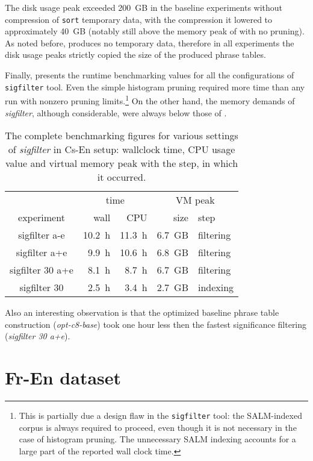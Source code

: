 The disk usage peak exceeded 200~GB in the baseline experiments without compression of
\texttt{sort} temporary data, with the compression it lowered to approximately 40~GB
(notably still above the memory peak of \eppex{} with no pruning).
As noted before, \eppex{} produces no temporary data, therefore in all experiments the
disk usage peaks strictly copied the size of the produced phrase tables.

Finally,  presents the runtime benchmarking
values for all the configurations of \texttt{sigfilter} tool.
Even the simple histogram pruning required more time than any \eppex{} run with nonzero
pruning limits.\footnote{This is partially due a design flaw in the \texttt{sigfilter} tool:
the SALM-indexed corpus is always required to proceed, even though it is not necessary in
the case of histogram pruning. The unnecessary SALM indexing accounts for a large part
of the reported wall clock time.}
On the other hand, the memory demands of \emph{sigfilter}, although considerable, were
always below those of \eppex{}.

\begin{table}[ht]
\centering
\begin{tabular}{ | c | r r | r l | }
\hline
 & \multicolumn{2}{|c|}{time} & \multicolumn{2}{|c|}{VM peak} \\
experiment & wall & CPU & size & step \\
\hline
\hline
sigfilter a-e     & 10.2~h & 11.3~h & 6.7~GB & filtering \\
sigfilter a+e     & 9.9~h & 10.6~h & 6.8~GB & filtering \\
sigfilter 30 a+e  & 8.1~h & 8.7~h & 6.7~GB & filtering \\
sigfilter 30      & 2.5~h & 3.4~h & 2.7~GB & indexing \\
\hline
\end{tabular}
\caption{\label{cs-en-wmt13-sigfilter-runtime-benchmarks}
The complete benchmarking figures for various settings of \emph{sigfilter} in Cs-En setup:
wallclock time, CPU usage value and virtual memory peak with the step, in which it occurred.}
\end{table}

Also an interesting observation is that the optimized baseline phrase table construction
(\emph{opt-c8-base}) took one hour less then the fastest significance filtering
(\emph{sigfilter 30 a+e}).

\section{Fr-En dataset}
\label{sec:fr-en-results}

